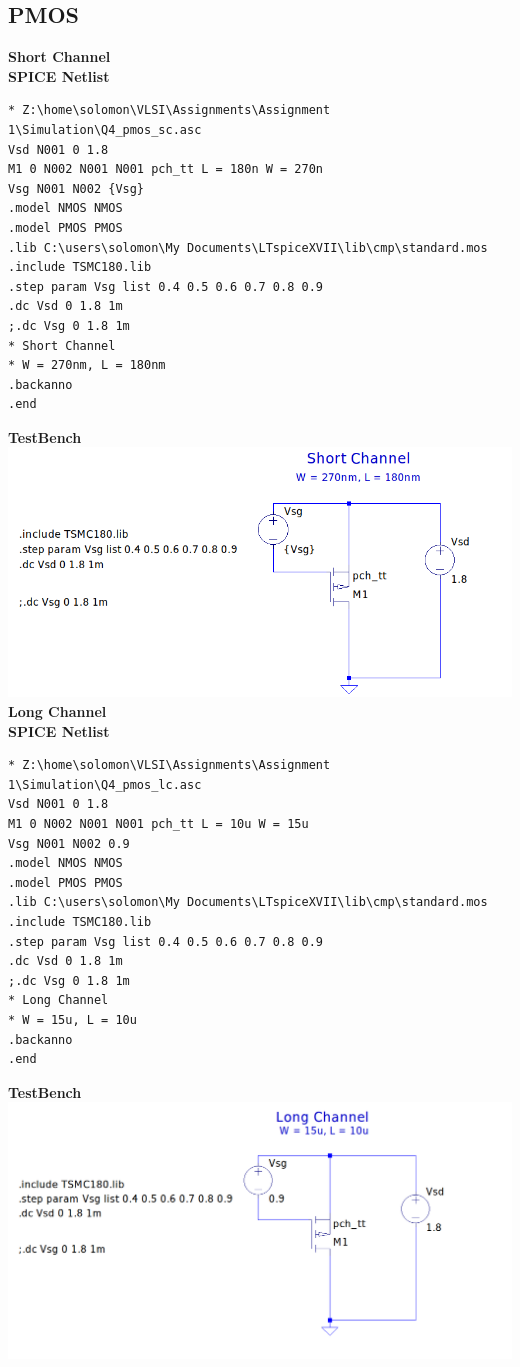 \documentclass{article}
\begin{document}
\subsection{PMOS}
\textbf{Short Channel}\\
\textbf{SPICE Netlist}
\begin{lstlisting}
* Z:\home\solomon\VLSI\Assignments\Assignment 1\Simulation\Q4_pmos_sc.asc
Vsd N001 0 1.8
M1 0 N002 N001 N001 pch_tt L = 180n W = 270n
Vsg N001 N002 {Vsg}
.model NMOS NMOS
.model PMOS PMOS
.lib C:\users\solomon\My Documents\LTspiceXVII\lib\cmp\standard.mos
.include TSMC180.lib
.step param Vsg list 0.4 0.5 0.6 0.7 0.8 0.9
.dc Vsd 0 1.8 1m
;.dc Vsg 0 1.8 1m
* Short Channel
* W = 270nm, L = 180nm
.backanno
.end
\end{lstlisting}
\textbf{TestBench}\\
\includegraphics[scale=0.4]{./figs/Q4_pmos_sc_tb.png}\\
 \newline
\textbf{Long Channel}\\
\textbf{SPICE Netlist}
\begin{lstlisting}
* Z:\home\solomon\VLSI\Assignments\Assignment 1\Simulation\Q4_pmos_lc.asc
Vsd N001 0 1.8
M1 0 N002 N001 N001 pch_tt L = 10u W = 15u
Vsg N001 N002 0.9
.model NMOS NMOS
.model PMOS PMOS
.lib C:\users\solomon\My Documents\LTspiceXVII\lib\cmp\standard.mos
.include TSMC180.lib
.step param Vsg list 0.4 0.5 0.6 0.7 0.8 0.9
.dc Vsd 0 1.8 1m
;.dc Vsg 0 1.8 1m
* Long Channel
* W = 15u, L = 10u
.backanno
.end
\end{lstlisting}
\textbf{TestBench}\\
\includegraphics[scale=0.28]{./figs/Q4_pmos_lc_tb.png}\\
\end{document}
